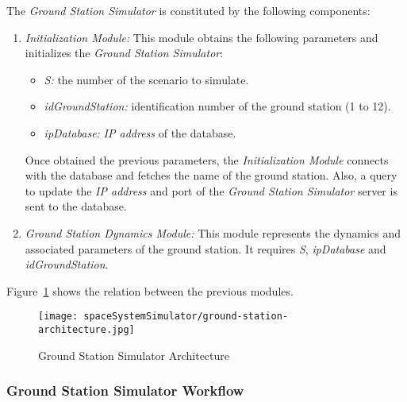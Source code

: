 The \emph{Ground Station Simulator} is constituted by the following components:
\begin{enumerate}
\item \emph{Initialization Module:} This module obtains the following parameters
  and   initializes the \emph{Ground Station Simulator}:
\begin{itemize}
\item \emph{S:} the number of the scenario to simulate.
\item \emph{idGroundStation:} identification number of the ground station (1 to 12).
\item \emph{ipDatabase:} \emph{IP address} of the database.
\end{itemize}

Once obtained the previous parameters, the \emph{Initialization Module} connects
with the database and fetches the name of the ground station. Also, a query to
update the \emph{IP address} and port of the \emph{Ground Station Simulator} server is sent to the database.
\item \emph{Ground Station Dynamics Module:} This module represents the dynamics and associated parameters of the ground station. It requires \emph{S}, \emph{ipDatabase} and \emph{idGroundStation}.
\end{enumerate}
Figure~\ref{fig:sss-ground-station-architecture} shows the relation between the previous modules.

\begin{figure}[!h]
\begin{center}
\texttt{[image: spaceSystemSimulator/ground-station-architecture.jpg]}
\caption{Ground Station Simulator Architecture}
\label{fig:sss-ground-station-architecture}
\end{center}
\end{figure}

\subsubsection{Ground Station Simulator Workflow}

